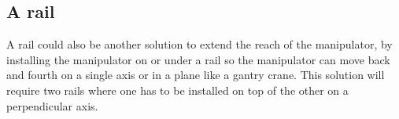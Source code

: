 \subsection{A rail} 
A rail could also be another solution to extend the reach of the manipulator, by installing the manipulator on or under a rail so the manipulator can move back and fourth on a single axis or in a plane like a gantry crane. This solution will require two rails where one has to be installed on top of the other on a perpendicular axis\cite{FRUNS}.